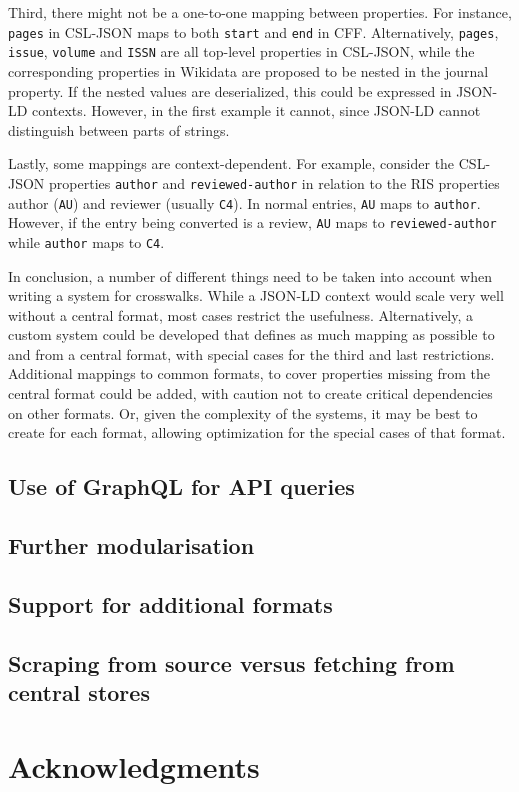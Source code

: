 \documentclass[fleqn,10pt,lineno]{wlpeerj} %
\begin{document}
Third, there might not be a one-to-one mapping between properties. For instance, \texttt{pages} in CSL-JSON maps to both \texttt{start} and \texttt{end} in CFF. Alternatively, \texttt{pages}, \texttt{issue}, \texttt{volume} and \texttt{ISSN} are all top-level properties in CSL-JSON, while the corresponding properties in Wikidata are proposed to be nested in the journal property. If the nested values are deserialized, this could be expressed in JSON-LD contexts. However, in the first example it cannot, since JSON-LD cannot distinguish between parts of strings.

Lastly, some mappings are context-dependent. For example, consider the CSL-JSON properties \texttt{author} and \texttt{reviewed-author} in relation to the RIS properties author (\texttt{AU}) and reviewer (usually \texttt{C4}). In normal entries, \texttt{AU} maps to \texttt{author}. However, if the entry being converted is a review, \texttt{AU} maps to \texttt{reviewed-author} while \texttt{author} maps to \texttt{C4}.

In conclusion, a number of different things need to be taken into account when writing a system for crosswalks. While a JSON-LD context would scale very well without a central format, most cases restrict the usefulness. Alternatively, a custom system could be developed that defines as much mapping as possible to and from a central format, with special cases for the third and last restrictions. Additional mappings to common formats, to cover properties missing from the central format could be added, with caution not to create critical dependencies on other formats. Or, given the complexity of the systems, it may be best to create for each format, allowing optimization for the special cases of that format.

\subsection*{Use of GraphQL for API queries}

\subsection*{Further modularisation}

\subsection*{Support for additional formats}

\subsection*{Scraping from source versus fetching from central stores}

\section*{Acknowledgments}



\end{document}
